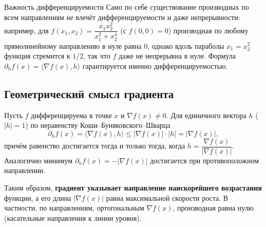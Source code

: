 \begin{Remark}{Важность дифференцируемости}{}
	Само по себе существование производных по всем направлениям \emph{не} влечёт
	дифференцируемости и даже непрерывности: например, для
	$f(x_1,x_2)=\dfrac{x_1 x_2^2}{x_1^2+x_2^4}$ (с $f(0,0)=0$) производная по любому
	прямолинейному направлению в нуле равна $0$, однако вдоль параболы $x_1=x_2^2$
	функция стремится к $1/2$, так что $f$ даже не непрерывна в нуле. Формула
	$\partial_h f(x)=\langle\nabla f(x),h\rangle$ гарантируется именно
	дифференцируемостью.
\end{Remark}

\subsection*{Геометрический смысл градиента}


Пусть $f$ дифференцируема в точке $x$ и $\nabla f(x)\ne 0$. Для единичного вектора
$h$ ($|h|=1$) по неравенству Коши--Буняковского--Шварца
\[
\partial_h f(x)=\langle\nabla f(x),h\rangle\le |\nabla f(x)|\cdot|h|=|\nabla f(x)|,
\]
причём равенство достигается тогда и только тогда, когда
$h=\dfrac{\nabla f(x)}{|\nabla f(x)|}$. Аналогично минимум
$\partial_h f(x)=-|\nabla f(x)|$ достигается при противоположном направлении.

Таким образом, \textbf{градиент указывает направление наискорейшего возрастания}
функции, а его длина $|\nabla f(x)|$ равна максимальной скорости роста. В частности,
по направлениям, ортогональным $\nabla f(x)$, производная равна нулю (касательные
направления к линии уровня).
